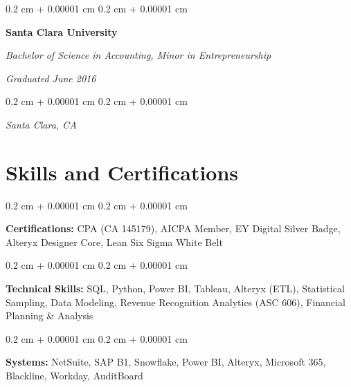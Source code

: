 \documentclass[10pt, letterpaper]{article}
\newenvironment{onecolentry}{
    \begin{adjustwidth}{
        0.2 cm + 0.00001 cm
    }{
        0.2 cm + 0.00001 cm
    }
}{
    \end{adjustwidth}
} %
\newenvironment{twocolentry}[2][]{
    \onecolentry
    \def\secondColumn{#2}
    \setcolumnwidth{\fill, 4.5 cm}
    \begin{paracol}{2}
}{
    \switchcolumn \raggedleft \secondColumn
    \end{paracol}
    \endonecolentry
} %
\begin{document}
        \begin{twocolentry}{
            \textit{Graduated June 2016}}
            \textbf{Santa Clara University}

            \textit{Bachelor of Science in Accounting, Minor in Entrepreneurship}
        \end{twocolentry}

        \vspace{0.10 cm}
        \begin{onecolentry}
            \textit{Santa Clara, CA}
        \end{onecolentry}

    
    \section{Skills and Certifications}

        \begin{onecolentry}
            \textbf{Certifications:} CPA (CA 145179), AICPA Member, EY Digital Silver Badge, Alteryx Designer Core, Lean Six Sigma White Belt
        \end{onecolentry}

        \vspace{0.2 cm}

        \begin{onecolentry}
            \textbf{Technical Skills:} SQL, Python, Power BI, Tableau, Alteryx (ETL), Statistical Sampling, Data Modeling, Revenue Recognition Analytics (ASC 606), Financial Planning \& Analysis
        \end{onecolentry}

        \vspace{0.2 cm}

        \begin{onecolentry}
            \textbf{Systems:} NetSuite, SAP B1, Snowflake, Power BI, Alteryx, Microsoft 365, Blackline, Workday, AuditBoard
        \end{onecolentry}
\end{document}
